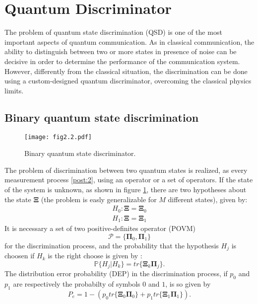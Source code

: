 \section{Quantum Discriminator}
    The problem of quantum state discrimination (QSD) is one of the most important
    aspects of quantum communication. As in classical communication, the ability to 
    distinguish between two or more states in presence of noise can be decisive in order to determine
    the performance of the communication system. However, differently from the classical situation,
    the discrimination can be done using a custom-designed quantum discriminator, overcoming
    the classical physics limits.

    \subsection{Binary quantum state discrimination}
    \begin{figure}[tbp]
        \begin{center}
            \texttt{[image: fig2.2.pdf]}
            \caption{Binary quantum state discriminator.}
            \label{fig:2.2}
        \end{center}
    \end{figure}
    The problem of discrimination between two quantum states is realized, as every measurement
    process \ref{post:2}, using an operator or a set of operators.
    If the state of the system is unknown, as shown in figure \ref{fig:2.2}, there are two hypotheses
    about the state $\pmb{\Xi}$ (the problem is easly generalizable for $M$ different states),
    given by:
    \begin{equation}\begin{split}
        H_0 : \pmb{\Xi}=\pmb{\Xi}_0\\
        H_1 : \pmb{\Xi}=\pmb{\Xi}_1
        \label{eq:binHyp}
    \end{split}\end{equation}
    It is necessary a set of two positive-definites operator (POVM)
    \begin{equation}
        \mathcal{P}=\{\pmb{\Pi}_0,\pmb{\Pi}_1\}
    \end{equation}
    for the discrimination process, and the probability that the hypothesis $H_j$ is choosen
    if $H_k$ is the right choose is given by \cite{tesiGuerrini}:
    \begin{equation}
        \mathbb{P}\{H_j|H_k\}=tr\{\pmb{\Xi}_k\pmb{\Pi}_j\}.
    \end{equation}
    The distribution error probability (DEP) in the discrimination process, if $p_0$ and $p_1$ are 
    respectively the probabilty of symbols $0$ and $1$, is so given by
    \begin{equation}
        P_e=1-\left(p_0 tr\{\pmb{\Xi}_0\pmb{\Pi}_0\}+p_1 tr\{\pmb{\Xi}_1\pmb{\Pi}_1\}\right).
    \end{equation}

